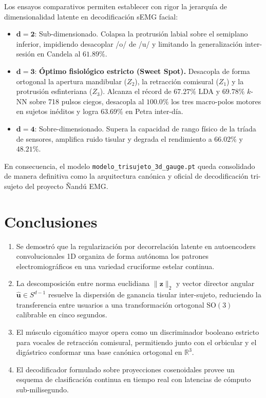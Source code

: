 \documentclass[11pt,a4paper,openany]{book}
\theoremstyle{definition}
\begin{document}
Los ensayos comparativos permiten establecer con rigor la jerarquía de dimensionalidad latente en decodificación sEMG facial:
\begin{itemize}
    \item $\mathbf{d = 2}$: Sub-dimensionado. Colapsa la protrusión labial sobre el semiplano inferior, impidiendo desacoplar /o/ de /u/ y limitando la generalización inter-sesión en Candela al $61.89\%$.
    \item $\mathbf{d = 3}$: \textbf{Óptimo fisiológico estricto (Sweet Spot).} Desacopla de forma ortogonal la apertura mandibular ($Z_2$), la retracción comisural ($Z_1$) y la protrusión esfinteriana ($Z_3$). Alcanza el récord de $\mathbf{67.27\%}$ LDA y $\mathbf{69.78\%}$ $k$-NN sobre 718 pulsos ciegos, desacopla al $\mathbf{100.0\%}$ los tres macro-polos motores en sujetos inéditos y logra $\mathbf{63.69\%}$ en Petra inter-día.
    \item $\mathbf{d = 4}$: Sobre-dimensionado. Supera la capacidad de rango físico de la tríada de sensores, amplifica ruido tisular y degrada el rendimiento a $66.02\%$ y $48.21\%$.
\end{itemize}

En consecuencia, el modelo \texttt{modelo\_trisujeto\_3d\_gauge.pt} queda consolidado de manera definitiva como la arquitectura canónica y oficial de decodificación tri-sujeto del proyecto Ñandú EMG.

\section{Conclusiones}
\label{sec:conclusiones}

\begin{enumerate}
    \item Se demostró que la regularización por decorrelación latente en autoencoders convolucionales 1D organiza de forma autónoma los patrones electromiográficos en una variedad cruciforme estelar continua.
    \item La descomposición entre norma euclidiana $\|\mathbf{z}\|_2$ y vector director angular $\hat{\mathbf{u}} \in S^{d-1}$ resuelve la dispersión de ganancia tisular inter-sujeto, reduciendo la transferencia entre usuarios a una transformación ortogonal $\text{SO}(3)$ calibrable en cinco segundos.
    \item El músculo cigomático mayor opera como un discriminador booleano estricto para vocales de retracción comisural, permitiendo junto con el orbicular y el digástrico conformar una base canónica ortogonal en $\mathbb{R}^3$.
    \item El decodificador formulado sobre proyecciones cosenoidales provee un esquema de clasificación continua en tiempo real con latencias de cómputo sub-milisegundo.
\end{enumerate}
\end{document}
